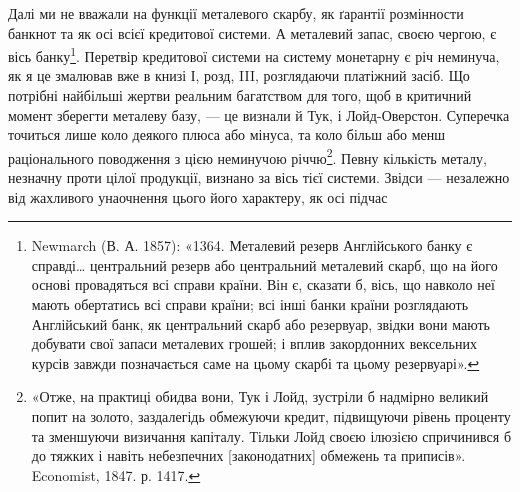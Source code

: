 Далі ми не вважали на функції металевого скарбу, як ґарантії розмінности
банкнот та як осі всієї кредитової системи. А металевий запас, своєю чергою,
є вісь банку\footnote{
Newmarch (В. А. 1857): «1364. Металевий резерв Англійського банку є справді\dots{} центральний
резерв або центральний металевий скарб, що на його основі провадяться всі справи країни.
Він є, сказати б, вісь, що навколо неї мають обертатись всі справи країни; всі інші банки країни
розглядають Англійський банк, як центральний скарб або резервуар, звідки вони мають добувати свої
запаси металевих грошей; і вплив закордонних вексельних курсів завжди позначається саме на цьому
скарбі та цьому резервуарі».
}. Перетвір кредитової системи на систему монетарну є річ неминуча,
як я це змалював вже в книзі І, розд, III, розглядаючи платіжний
засіб. Що потрібні найбільші жертви реальним багатством для того, щоб в критичний
момент зберегти металеву базу, — це визнали й Тук, і Лойд-Оверстон.
Суперечка точиться лише коло деякого плюса або мінуса, та коло більш або
менш раціонального поводження з цією неминучою річчю\footnote{
«Отже, на практиці обидва вони, Тук і Лойд, зустріли б надмірно великий попит на золото,
заздалегідь обмежуючи кредит, підвищуючи рівень проценту та зменшуючи визичання капіталу. Тільки
Лойд своєю ілюзією спричинився б до тяжких і навіть небезпечних [законодатних] обмежень та
приписів».
Economist, 1847. р. 1417.
}. Певну кількість
металу, незначну проти цілої продукції, визнано за вісь тієї системи. Звідси —
незалежно від жахливого унаочнення цього його характеру, як осі підчас
\parbreak{}  %
